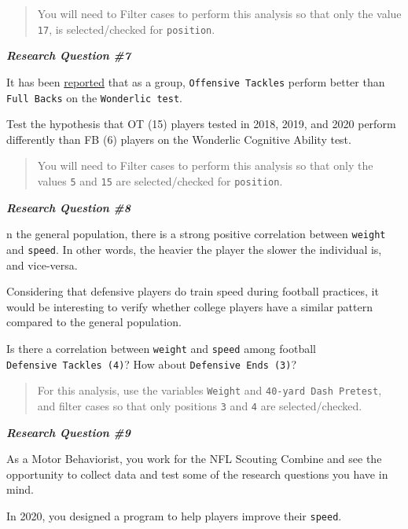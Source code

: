 \documentclass[11pt,]{article}
\begin{document}
\begin{quote}
You will need to Filter cases to perform this analysis so that only the
value \texttt{17}, is selected/checked for \texttt{position}.
\end{quote}

\textbf{\emph{Research Question \#7}}

It has been
\href{https://www.cbssports.com/nfl/news/nfl-draft-combine-the-highest-and-lowest-wonderlic-test-scores-ever-recorded/}{reported}
that as a group, \texttt{Offensive\ Tackles} perform better than
\texttt{Full\ Backs} on the \texttt{Wonderlic\ test}.

Test the hypothesis that OT (15) players tested in 2018, 2019, and 2020
perform differently than FB (6) players on the Wonderlic Cognitive
Ability test.

\begin{quote}
You will need to Filter cases to perform this analysis so that only the
values \texttt{5} and \texttt{15} are selected/checked for
\texttt{position}.
\end{quote}

\textbf{\emph{Research Question \#8}}

n the general population, there is a strong positive correlation between
\texttt{weight} and \texttt{speed}. In other words, the heavier the
player the slower the individual is, and vice-versa.

Considering that defensive players do train speed during football
practices, it would be interesting to verify whether college players
have a similar pattern compared to the general population.

Is there a correlation between \texttt{weight} and \texttt{speed} among
football \texttt{Defensive\ Tackles\ (4)}? How about
\texttt{Defensive\ Ends\ (3)}?

\begin{quote}
For this analysis, use the variables \texttt{Weight} and
\texttt{40-yard\ Dash\ Pretest}, and filter cases so that only positions
\texttt{3} and \texttt{4} are selected/checked.
\end{quote}

\textbf{\emph{Research Question \#9}}

As a Motor Behaviorist, you work for the NFL Scouting Combine and see
the opportunity to collect data and test some of the research questions
you have in mind.

In 2020, you designed a program to help players improve their
\texttt{speed}.
\end{document}
